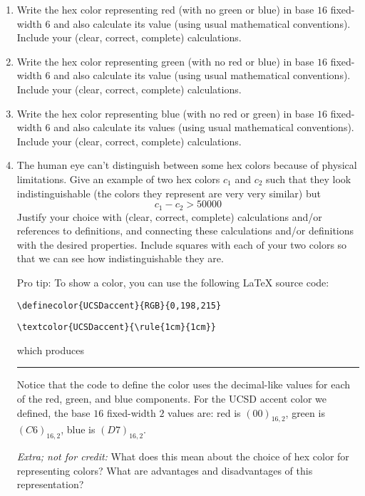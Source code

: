 \begin{enumerate}
    \begin{enumerate}
    \item  Write the hex color representing red (with no green or blue) 
    in base $16$ fixed-width $6$ and also calculate its value 
    (using usual mathematical conventions).
    Include your (clear, correct, complete) calculations.
    \item  Write the hex color representing green (with no red or blue) 
    in base $16$ fixed-width $6$ and also calculate its value
    (using usual mathematical conventions).
    Include your (clear, correct, complete) calculations.
    \item  Write the hex color representing blue (with no red or green) 
    in base $16$ fixed-width $6$ and also calculate its values
    (using usual mathematical conventions).
    Include your (clear, correct, complete) calculations.
    \item The human eye can't distinguish between some hex colors because of 
    physical limitations. Give an example of two hex colors $c_1$ and $c_2$ such that
    they look indistinguishable (the colors they represent are very very similar) but
        \[
            c_1 - c_2 > 50000
        \]
    Justify your choice 
    with (clear, correct, complete) calculations and/or references to definitions, 
    and connecting these
    calculations and/or definitions with
    the desired properties.  Include squares with each of your two colors so 
    that we can see how indistinguishable they are. 

    Pro tip: To show a color, you can use the following LaTeX source code:
    
        \verb|\definecolor{UCSDaccent}{RGB}{0,198,215}|

        \verb|\textcolor{UCSDaccent}{\rule{1cm}{1cm}}|

    which produces 
    \textcolor{UCSDaccent}{\rule{1cm}{1cm}}

    Notice that the code to define the color uses the decimal-like values 
    for each of the red, green, and blue components. For the UCSD accent color we defined, 
    the base $16$ fixed-width $2$ values are: red is $(00)_{16,2}$, green is $(C6)_{16,2}$,
    blue is $(D7)_{16,2}$.

    {\it Extra; not for credit:} What does this mean about the choice of hex color for
    representing colors? What are advantages and disadvantages of this representation?

    \end{enumerate}


\end{enumerate}
